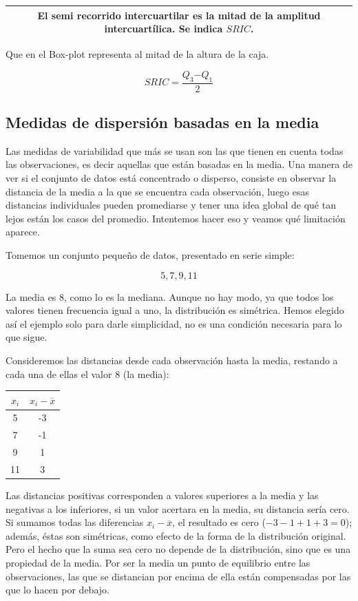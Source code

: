 \documentclass[]{book}
\begin{document}
\begin{longtable}[]{@{}c@{}}
\toprule
\endhead
\begin{minipage}[t]{0.97\columnwidth}\centering
El \textbf{semi recorrido intercuartilar} es la mitad de la amplitud intercuartílica. Se indica \(SRIC\).\strut
\end{minipage}\tabularnewline
\bottomrule
\end{longtable}

Que en el Box-plot representa al mitad de la altura de la caja.

\[SRIC = \frac{Q_{3}{- Q}_{1}}{2}\]

\hypertarget{medidas-de-dispersion-basadas-en-la-media}{%
\subsection{Medidas de dispersión basadas en la media}\label{medidas-de-dispersion-basadas-en-la-media}}

Las medidas de variabilidad que más se usan son las que tienen en cuenta
todas las observaciones, es decir aquellas que están basadas en la
media. Una manera de ver si el conjunto de datos está concentrado o
disperso, consiste en observar la distancia de la media a la que se
encuentra cada observación, luego esas distancias individuales pueden
promediarse y tener una idea global de qué tan lejos están los casos del
promedio. Intentemos hacer eso y veamos qué limitación aparece.

Tomemos un conjunto pequeño de datos, presentado en serie simple:

\[5, 7, 9, 11\]

La media es 8, como lo es la mediana. Aunque no hay modo, ya que todos
los valores tienen frecuencia igual a uno, la distribución es simétrica.
Hemos elegido así el ejemplo solo para darle simplicidad, no es una
condición necesaria para lo que sigue.

Consideremos las distancias desde cada observación hasta la media,
restando a cada una de ellas el valor 8 (la media):

\begin{longtable}[]{@{}cc@{}}
\toprule
\(x_{i}\) & \(x_{i} - \overline{x}\)\tabularnewline
\midrule
\endhead
5 & -3\tabularnewline
7 & -1\tabularnewline
9 & 1\tabularnewline
11 & 3\tabularnewline
\bottomrule
\end{longtable}

Las distancias positivas corresponden a valores superiores a la media y
las negativas a los inferiores, si un valor acertara en la media, su
distancia sería cero. Si sumamos todas las diferencias
\(x_{i} - \overline{x}\), el resultado es cero (\(-3-1+1+3=0\)); además, éstas
son simétricas, como efecto de la forma de la distribución original.
Pero el hecho que la suma sea cero no depende de la distribución, sino que es una propiedad de la media. Por ser la media un punto de equilibrio entre las observaciones, las que se distancian por
encima de ella están compensadas por las que lo hacen por debajo.
\end{document}
